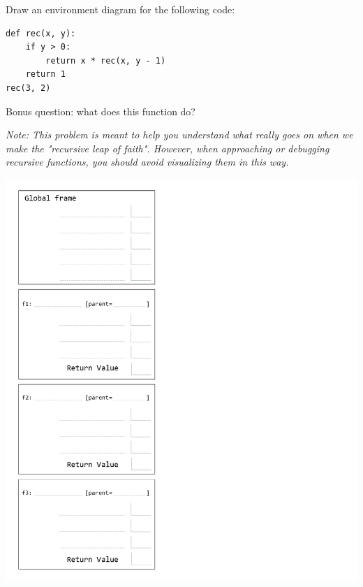 \question Draw an environment diagram for the following code:

\begin{lstlisting}
def rec(x, y):
    if y > 0:
        return x * rec(x, y - 1)
    return 1
rec(3, 2)
\end{lstlisting}
Bonus question: what does this function do?

\textit{Note: This problem is meant to help you understand what really goes on when we make the "recursive leap of faith".
However, when approaching or debugging recursive functions, you should avoid visualizing them in this way.}

\begin{center}
\includegraphics[scale=.5]{env-diagram-template.png}
\end{center}

